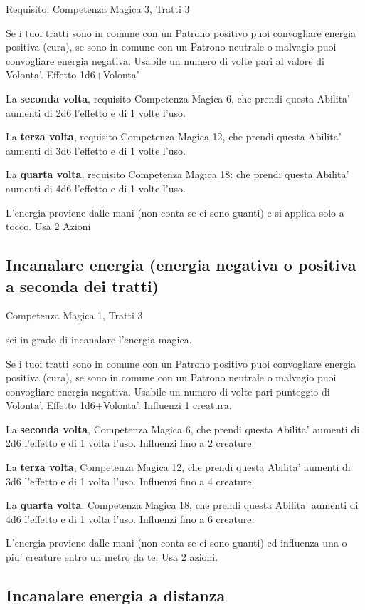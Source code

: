 \documentclass[a4paper,11pt,twoside,openany]{book}
\begin{document}
Requisito: Competenza Magica 3, Tratti 3

Se i tuoi tratti sono in comune con un Patrono positivo puoi convogliare energia positiva (cura), se sono in comune con un Patrono neutrale o malvagio puoi convogliare energia negativa. Usabile un numero di volte pari al valore di Volonta'. Effetto 1d6+Volonta'

La \textbf{seconda volta}, requisito Competenza Magica 6, che prendi questa Abilita' aumenti di 2d6 l'effetto e di 1 volte l'uso.

La \textbf{terza volta}, requisito Competenza Magica 12, che prendi questa Abilita' aumenti di 3d6 l'effetto e di 1 volte l'uso.

La \textbf{quarta volta}, requisito Competenza Magica 18: che prendi questa Abilita' aumenti di 4d6 l'effetto e di 1 volte l'uso.

L'energia proviene dalle mani (non conta se ci sono guanti) e si applica solo a tocco. Usa 2 Azioni

\subsection{Incanalare energia (energia negativa o positiva a seconda dei tratti)}

Competenza Magica 1, Tratti 3

sei in grado di incanalare l'energia magica.

Se i tuoi tratti sono in comune con un Patrono positivo puoi convogliare energia positiva (cura), se sono in comune con un Patrono neutrale o malvagio puoi convogliare energia negativa. Usabile un numero di volte pari punteggio di Volonta'. Effetto 1d6+Volonta'. Influenzi 1 creatura.

La \textbf{seconda volta}, Competenza Magica 6, che prendi questa Abilita' aumenti di 2d6 l'effetto e di 1 volta l'uso. Influenzi fino a 2 creature.

La \textbf{terza volta}, Competenza Magica 12, che prendi questa Abilita' aumenti di 3d6 l'effetto e di 1 volta l'uso. Influenzi fino a 4 creature.

La \textbf{quarta volta}. Competenza Magica 18, che prendi questa Abilita' aumenti di 4d6 l'effetto e di 1 volta l'uso. Influenzi fino a 6 creature.

L'energia proviene dalle mani (non conta se ci sono guanti) ed influenza una o piu' creature entro un metro da te. Usa 2 azioni.

\subsection{Incanalare energia a distanza}
\end{document}
